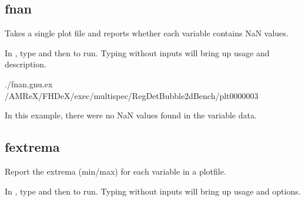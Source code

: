 \documentclass[letterpaper,10pt,english]{sphinxmanual}
\begin{document}
\subsection{fnan}
\label{\detokenize{Post_Processing:fnan}}
\sphinxAtStartPar
Takes a single plot file and reports whether each variable contains
NaN values.

\sphinxAtStartPar
{}

\sphinxAtStartPar
In , type  and then  to run.
Typing  without inputs will bring up usage and description.

\sphinxAtStartPar
{}

\begin{sphinxVerbatim}[commandchars=\\\{\}]
./fnan.gnu.ex 
\PYGZti{}/AMReX/FHDeX/exec/multispec/Reg\PYGZus{}DetBubble\PYGZus{}2d\PYGZus{}Bench/plt0000003
\end{sphinxVerbatim}

\sphinxAtStartPar
In this example, there were no NaN values found in the variable data.

\begin{DUlineblock}{0em}
\item[] 
\end{DUlineblock}


\subsection{fextrema}
\label{\detokenize{Post_Processing:fextrema}}
\sphinxAtStartPar
Report the extrema (min/max) for each variable in a plotfile.

\sphinxAtStartPar
{}

\sphinxAtStartPar
In , type  and then  to run.
Typing  without inputs will bring up usage and options.
\end{document}
